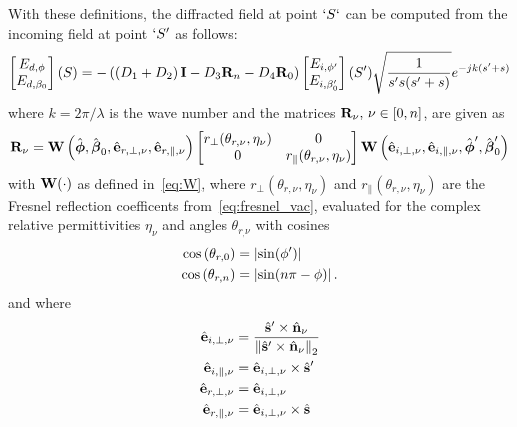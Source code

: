 With these definitions, the diffracted field at point $`S`$ can be computed from the incoming field at point $`S'$ as follows:
\begin{align}
    \begin{bmatrix}
        E_{d,\phi} \\
        E_{d,\beta_0}
    \end{bmatrix} (S)
    = - \left( \left( D_1 + D_2 \right) \mathbf{I} - D_3 \mathbf{R}_n - D_4\mathbf{R}_0 \right)
    \begin{bmatrix}
        E_{i,\phi'} \\
        E_{i,\beta_0'}
    \end{bmatrix}(S') \sqrt{\frac{1}{s's(s'+s)}} e^{-jk(s'+s)}
\end{align}
where $k=2\pi/\lambda$ is the wave number and the matrices $\mathbf{R}_\nu,\, \nu \in [0,n]$, are given as
\begin{align}
    \label{eq:diffraction-matrix}
    \mathbf{R}_\nu = \mathbf{W}\left( \hat{\boldsymbol{\phi}}, \hat{\boldsymbol{\beta}}_0, \hat{\mathbf{e}}_{r, \perp, \nu}, \hat{\mathbf{e}}_{r, \parallel, \nu}  \right)
    \begin{bmatrix}
        r_{\perp}(\theta_{r,\nu}, \eta_{\nu}) & 0\\
        0 & r_{\parallel}(\theta_{r,\nu}, \eta_{\nu})
    \end{bmatrix}
    \mathbf{W}\left( \hat{\mathbf{e}}_{i, \perp, \nu}, \hat{\mathbf{e}}_{i, \parallel, \nu}, \hat{\boldsymbol{\phi}}', \hat{\boldsymbol{\beta}}_0' \right)
\end{align}
with $\mathbf{W}(\cdot)$ as defined in~\eqref{eq:W}, where $r_{\perp}(\theta_{r,\nu}, \eta_{\nu})$ and $r_{\parallel}(\theta_{r,\nu}, \eta_{\nu})$ are the Fresnel reflection coefficents from~\eqref{eq:fresnel_vac}, evaluated for the complex relative permittivities $\eta_{\nu}$ and angles $\theta_{r_,\nu}$ with cosines
\begin{align}
    \label{eq:diffraction-cos}
    \cos\left( \theta_{r,0} \right) &= \left|\sin(\phi') \right|\\
    \cos\left( \theta_{r,n} \right) &= \left|\sin(n\pi -\phi) \right|.
\end{align}
and where
\begin{align}
    \hat{\mathbf{e}}_{i,\perp,\nu} &= \frac{ \hat{\mathbf{s}}' \times \hat{\mathbf{n}}_{\nu} }{\left\lVert\hat{\mathbf{s}}' \times \hat{\mathbf{n}}_{\nu}\right\rVert_2 }\\
    \hat{\mathbf{e}}_{i,\parallel,\nu} &=  \hat{\mathbf{e}}_{i,\perp,\nu} \times \hat{\mathbf{s}}'\\
    \hat{\mathbf{e}}_{r,\perp,\nu} &=  \hat{\mathbf{e}}_{i,\perp,\nu}\\
    \hat{\mathbf{e}}_{r,\parallel,\nu} &=  \hat{\mathbf{e}}_{i,\perp,\nu} \times \hat{\mathbf{s}}
\end{align}
